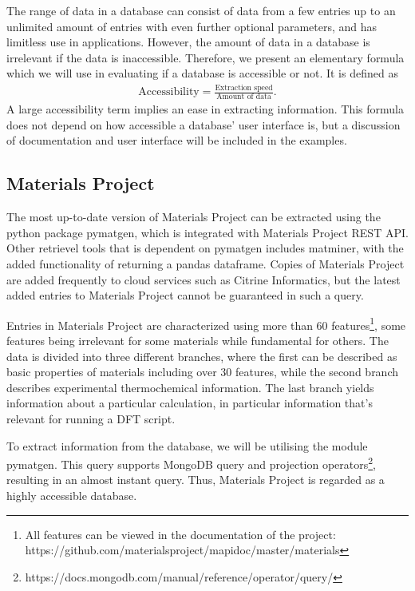 The range of data in a database can consist of data from a few entries up to an unlimited amount of entries with even further optional parameters, and has limitless use in applications. However, the amount of data in a database is irrelevant if the data is inaccessible. Therefore, we present an elementary formula which we will use in evaluating if a database is accessible or not. It is defined as
\begin{align}
  \text{Accessibility} = \frac{\text{Extraction speed}}{\text{Amount of data}}.
\end{align}
A large accessibility term implies an ease in extracting information. This formula does not depend on how accessible a database' user interface is, but a discussion of documentation and user interface will be included in the examples.

\subsection{Materials Project }

The most up-to-date version of Materials Project can be extracted using the python package pymatgen, which is integrated with Materials Project REST API. Other retrievel tools that is dependent on pymatgen includes matminer, with the added functionality of returning a pandas dataframe. Copies of Materials Project are added frequently to cloud services such as Citrine Informatics, but the latest added entries to Materials Project cannot be guaranteed in such a query.

Entries in Materials Project are characterized using more than 60 features\footnote{All features can be viewed in the documentation of the project: https://github.com/materialsproject/mapidoc/master/materials}, some features being irrelevant for some materials while fundamental for others. The data is divided into three different branches, where the first can be described as basic properties of materials including over $30$ features, while the second branch describes experimental thermochemical information. The last branch yields information about a particular calculation, in particular information that's relevant for running a DFT script.

To extract information from the database, we will be utilising the module pymatgen. This query supports MongoDB query and projection operators\footnote{https://docs.mongodb.com/manual/reference/operator/query/}, resulting in an almost instant query. Thus, Materials Project is regarded as a highly accessible database.

